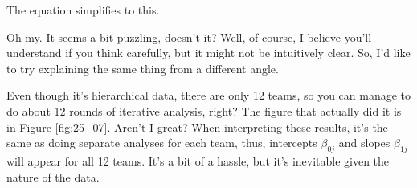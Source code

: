 \documentclass{ltjsbook}
\begin{document}
The equation simplifies to this.


Oh my. It seems a bit puzzling, doesn't it? Well, of course, I believe you'll understand if you think carefully, but it might not be intuitively clear. So, I'd like to try explaining the same thing from a different angle.

Even though it's hierarchical data, there are only 12 teams, so you can manage to do about 12 rounds of iterative analysis, right? The figure that actually did it is in Figure \ref{fig:25_07}. Aren't I great?
When interpreting these results, it's the same as doing separate analyses for each team, thus, intercepts $\beta_{0j}$ and slopes $\beta_{1j}$ will appear for all 12 teams. It's a bit of a hassle, but it’s inevitable given the nature of the data.


\end{document}
